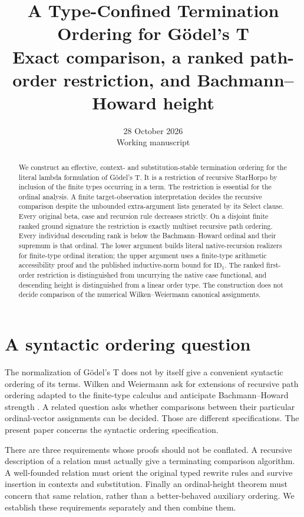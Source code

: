 \documentclass[11pt,a4paper]{article}
\title{A Type-Confined Termination Ordering for G\"odel's T\\
Exact comparison, a ranked path-order restriction, and Bachmann--Howard height}
\author{}
\date{28 October 2026\\Working manuscript}
\begin{document}
\maketitle
\begin{abstract}
We construct an effective, context- and substitution-stable termination
ordering for the literal lambda formulation of G\"odel's T.  It is a restriction
of recursive StarHorpo by inclusion of the finite types occurring in a term.
The restriction is essential for the ordinal analysis.  A finite
target-observation interpretation decides the recursive comparison despite
the unbounded extra-argument lists generated by its Select clause.
Every original beta, case and recursion rule decreases strictly.  On a
disjoint finite ranked ground signature the restriction is exactly multiset
recursive path ordering.  Every individual descending rank is below the
Bachmann--Howard ordinal and their supremum is that ordinal.  The lower
argument builds literal native-recursion realizers for finite-type ordinal
iteration; the upper argument uses a finite-type arithmetic accessibility
proof and the published inductive-norm bound for $\mathrm{ID}_1$.
The ranked first-order restriction is distinguished from uncurrying the native
case functional, and descending height is distinguished from a linear order
type.  The construction does not decide comparison of the numerical
Wilken--Weiermann canonical assignments.
\end{abstract}
\tableofcontents

\section{A syntactic ordering question}
The normalization of G\"odel's T does not by itself give a convenient
syntactic ordering of its terms.  Wilken and Weiermann ask for extensions of
recursive path ordering adapted to the finite-type calculus and anticipate
Bachmann--Howard strength \cite[Introduction]{ww}.  A related question asks
whether comparisons between their particular ordinal-vector assignments can
be decided.  Those are different specifications.  The present paper concerns
the syntactic ordering specification.

There are three requirements whose proofs should not be conflated.  A
recursive description of a relation must actually give a terminating
comparison algorithm.  A well-founded relation must orient the original
typed rewrite rules and survive insertion in contexts and substitution.
Finally an ordinal-height theorem must concern that same relation, rather
than a better-behaved auxiliary ordering.  We establish these requirements
separately and then combine them.
\end{document}
